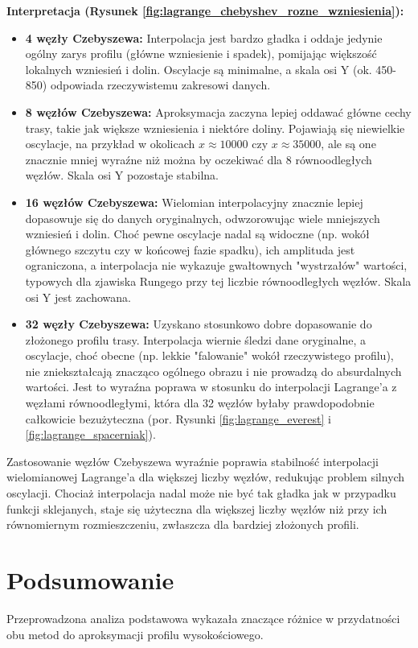 \documentclass[11pt,a4paper]{article}
\begin{document}
\textbf{Interpretacja (Rysunek \ref{fig:lagrange_chebyshev_rozne_wzniesienia}):}
\begin{itemize}
    \item \textbf{4 węzły Czebyszewa:} Interpolacja jest bardzo gładka i oddaje jedynie ogólny zarys profilu (główne wzniesienie i spadek), pomijając większość lokalnych wzniesień i dolin. Oscylacje są minimalne, a skala osi Y (ok. 450-850) odpowiada rzeczywistemu zakresowi danych.
    \item \textbf{8 węzłów Czebyszewa:} Aproksymacja zaczyna lepiej oddawać główne cechy trasy, takie jak większe wzniesienia i niektóre doliny. Pojawiają się niewielkie oscylacje, na przykład w okolicach $x \approx 10000$ czy $x \approx 35000$, ale są one znacznie mniej wyraźne niż można by oczekiwać dla 8 równoodległych węzłów. Skala osi Y pozostaje stabilna.
    \item \textbf{16 węzłów Czebyszewa:} Wielomian interpolacyjny znacznie lepiej dopasowuje się do danych oryginalnych, odwzorowując wiele mniejszych wzniesień i dolin. Choć pewne oscylacje nadal są widoczne (np. wokół głównego szczytu czy w końcowej fazie spadku), ich amplituda jest ograniczona, a interpolacja nie wykazuje gwałtownych "wystrzałów" wartości, typowych dla zjawiska Rungego przy tej liczbie równoodległych węzłów. Skala osi Y jest zachowana.
    \item \textbf{32 węzły Czebyszewa:} Uzyskano stosunkowo dobre dopasowanie do złożonego profilu trasy. Interpolacja wiernie śledzi dane oryginalne, a oscylacje, choć obecne (np. lekkie "falowanie" wokół rzeczywistego profilu), nie zniekształcają znacząco ogólnego obrazu i nie prowadzą do absurdalnych wartości. Jest to wyraźna poprawa w stosunku do interpolacji Lagrange'a z węzłami równoodległymi, która dla 32 węzłów byłaby prawdopodobnie całkowicie bezużyteczna (por. Rysunki \ref{fig:lagrange_everest} i \ref{fig:lagrange_spacerniak}).
\end{itemize}
Zastosowanie węzłów Czebyszewa wyraźnie poprawia stabilność interpolacji wielomianowej Lagrange'a dla większej liczby węzłów, redukując problem silnych oscylacji. Chociaż interpolacja nadal może nie być tak gładka jak w przypadku funkcji sklejanych, staje się użyteczna dla większej liczby węzłów niż przy ich równomiernym rozmieszczeniu, zwłaszcza dla bardziej złożonych profili.

\section{Podsumowanie}
\label{sec:podsumowanie}
Przeprowadzona analiza podstawowa wykazała znaczące różnice w przydatności obu metod do aproksymacji profilu wysokościowego.
\end{document}
